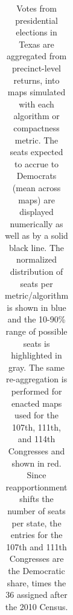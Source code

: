 \begin{table}
\begin{tabular}{l rm{7em} rm{7em} rm{7em} rm{7em}}
\hline \hline
\end{tabular}
\caption{Votes from presidential elections in Texas are aggregated from precinct-level returns, into maps simulated with each algorithm or compactness metric. 
             The seats expected to accrue to Democrats (mean across maps) are displayed numerically as well as by a solid black line.
             The normalized distribution of seats per metric/algorithm is shown in blue and the 10-90\% range of possible seats is highlighted in gray.
             The same re-aggregation is performed for enacted maps used for the 107th, 111th, and 114th Congresses and shown in red.
             Since reapportionment shifts the number of seats per state,
               the entries for the 107th and 111th Congresses are the Democratic share,
               times the 36 assigned after the 2010 Census.
             }\label{tab:TX_seats}
\end{table}
 